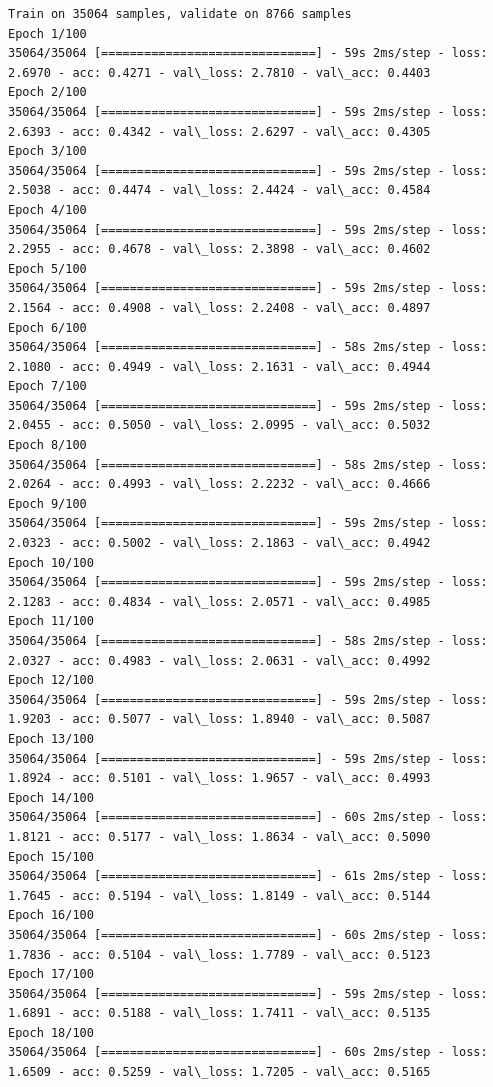 \documentclass[11pt]{article}
\begin{document}
    \begin{Verbatim}[commandchars=\\\{\}]
Train on 35064 samples, validate on 8766 samples
Epoch 1/100
35064/35064 [==============================] - 59s 2ms/step - loss: 2.6970 - acc: 0.4271 - val\_loss: 2.7810 - val\_acc: 0.4403
Epoch 2/100
35064/35064 [==============================] - 59s 2ms/step - loss: 2.6393 - acc: 0.4342 - val\_loss: 2.6297 - val\_acc: 0.4305
Epoch 3/100
35064/35064 [==============================] - 59s 2ms/step - loss: 2.5038 - acc: 0.4474 - val\_loss: 2.4424 - val\_acc: 0.4584
Epoch 4/100
35064/35064 [==============================] - 59s 2ms/step - loss: 2.2955 - acc: 0.4678 - val\_loss: 2.3898 - val\_acc: 0.4602
Epoch 5/100
35064/35064 [==============================] - 59s 2ms/step - loss: 2.1564 - acc: 0.4908 - val\_loss: 2.2408 - val\_acc: 0.4897
Epoch 6/100
35064/35064 [==============================] - 58s 2ms/step - loss: 2.1080 - acc: 0.4949 - val\_loss: 2.1631 - val\_acc: 0.4944
Epoch 7/100
35064/35064 [==============================] - 59s 2ms/step - loss: 2.0455 - acc: 0.5050 - val\_loss: 2.0995 - val\_acc: 0.5032
Epoch 8/100
35064/35064 [==============================] - 58s 2ms/step - loss: 2.0264 - acc: 0.4993 - val\_loss: 2.2232 - val\_acc: 0.4666
Epoch 9/100
35064/35064 [==============================] - 59s 2ms/step - loss: 2.0323 - acc: 0.5002 - val\_loss: 2.1863 - val\_acc: 0.4942
Epoch 10/100
35064/35064 [==============================] - 59s 2ms/step - loss: 2.1283 - acc: 0.4834 - val\_loss: 2.0571 - val\_acc: 0.4985
Epoch 11/100
35064/35064 [==============================] - 58s 2ms/step - loss: 2.0327 - acc: 0.4983 - val\_loss: 2.0631 - val\_acc: 0.4992
Epoch 12/100
35064/35064 [==============================] - 59s 2ms/step - loss: 1.9203 - acc: 0.5077 - val\_loss: 1.8940 - val\_acc: 0.5087
Epoch 13/100
35064/35064 [==============================] - 59s 2ms/step - loss: 1.8924 - acc: 0.5101 - val\_loss: 1.9657 - val\_acc: 0.4993
Epoch 14/100
35064/35064 [==============================] - 60s 2ms/step - loss: 1.8121 - acc: 0.5177 - val\_loss: 1.8634 - val\_acc: 0.5090
Epoch 15/100
35064/35064 [==============================] - 61s 2ms/step - loss: 1.7645 - acc: 0.5194 - val\_loss: 1.8149 - val\_acc: 0.5144
Epoch 16/100
35064/35064 [==============================] - 60s 2ms/step - loss: 1.7836 - acc: 0.5104 - val\_loss: 1.7789 - val\_acc: 0.5123
Epoch 17/100
35064/35064 [==============================] - 59s 2ms/step - loss: 1.6891 - acc: 0.5188 - val\_loss: 1.7411 - val\_acc: 0.5135
Epoch 18/100
35064/35064 [==============================] - 60s 2ms/step - loss: 1.6509 - acc: 0.5259 - val\_loss: 1.7205 - val\_acc: 0.5165

\end{Verbatim}
\end{document}
